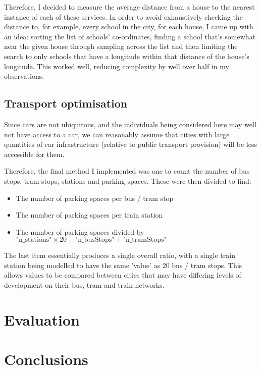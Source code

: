 \documentclass[11pt]{article} %
\begin{document}
Therefore, I decided to measure the average distance from a house to the nearest instance of each of these services. In order to avoid exhaustively checking the distance to, for example, every school in the city, for each house, I came up with an idea: sorting the list of schools' co-ordinates, finding a school that's somewhat near the given house through sampling across the list and then limiting the search to only schools that have a longitude within that distance of the house's longitude. This worked well, reducing complexity by well over half in my observations.

\subsection{Transport optimisation}
Since cars are not ubiquitous, and the individuals being considered here may well not have access to a car, we can reasonably assume that cities with large quantities of car infrastructure (relative to public transport provision) will be less accessible for them.

Therefore, the final method I implemented was one to count the number of bus stops, tram stops, stations and parking spaces. These were then divided to find:

\begin{itemize}
	\item The number of parking spaces per bus / tram stop
	\item The number of parking spaces per train station
	\item The number of parking spaces divided by $\text{"n\_stations"}\times 20 + \text{"n\_busStops"} + \text{"n\_tramStops"}$
\end{itemize}

The last item essentially produces a single overall ratio, with a single train station being modelled to have the same 'value' as 20 bus / tram stops. This allows values to be compared between cities that may have differing levels of development on their bus, tram and train networks.


\section{Evaluation}



\section{Conclusions}

\printbibliography
\end{document}
